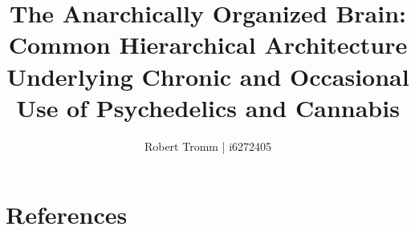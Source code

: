 \documentclass[12pt]{ociamthesis}  %
\title{The Anarchically Organized Brain:\\Common Hierarchical Architecture Underlying Chronic and Occasional Use of Psychedelics and Cannabis}   %
\author{Robert Tromm | i6272405}             %
\begin{document}

\setcounter{secnumdepth}{3}
\setcounter{tocdepth}{3}


\maketitle                  %

\begin{romanpages}          %
\tableofcontents            %
\listoffigures              %
\end{romanpages}            %





%



\chapter{References}
\printbibliography[heading=none]

\appendix

\end{document}
